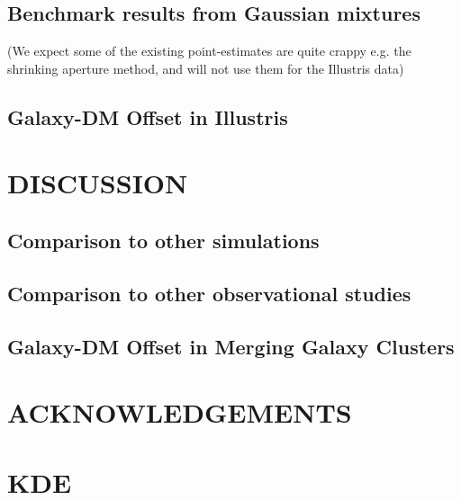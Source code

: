 \documentclass[letterpaper,useAMS,usenatbib]{mn2e}
\begin{document}
\subsection{Benchmark results from Gaussian mixtures} 
(We expect some of the existing point-estimates are quite crappy e.g. the
shrinking aperture method, and will not
use them for the Illustris data) 

\subsection{Galaxy-DM Offset in Illustris}


\section{DISCUSSION}
\subsection{Comparison to other simulations}
\subsection{Comparison to other observational studies}
\subsection{Galaxy-DM Offset in Merging Galaxy Clusters}
\section{ACKNOWLEDGEMENTS}




\appendix
\section{KDE}
\clearpage\bsp\label{lastpage} 
\end{document}
